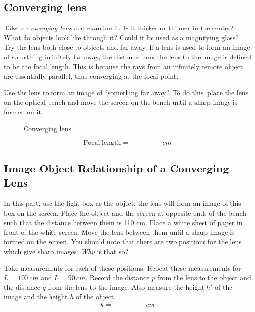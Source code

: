 \documentclass[11pt, a4paper]{article}
\begin{document}
\subsection{Converging lens}
Take a \textit{converging lens} and examine it.
Is it thicker or thinner in the center?
What do objects look like through it?
Could it be used as a magnifying glass?
Try the lens both close to objects and far away.
\fillwithlines{3cm}
If a lens is used to form an image of something infinitely far away, the
distance from the lens to the image is defined to be the focal length. 
This is because the rays from an infinitely remote object are essentially
parallel, thus converging at the focal point.

Use the lens to form an image of “something far away”. 
To do this, place the lens on the optical bench and move the screen on the
bench until a sharp image is formed on it. 
\begin{figure}[tbh]
    \centering
    \def\svgwidth{0.7\textwidth}
    
    \caption{Converging lens}
    \label{fig:convLens}
\end{figure}
\begin{equation*}
    \text{Focal length} = \underline{\hspace{2cm}}\si{cm}
\end{equation*}

\subsection{Image-Object Relationship of a Converging Lens}
In this part, use the light box as the object; the lens will form an image of
this box on the screen.
Place the object and the screen at opposite ends of the bench such that the
distance between them is 110 cm.
Place a white sheet of paper in front of the white screen. 
Move the lens between them until a sharp image is formed on the screen.
You should note that there are two positions for the lens which give sharp
images. \textit{Why} is that so?
\fillwithlines{3cm}

Take measurements for each of these positions.
Repeat these measurements for $L = 100~\si{cm}$ and $L = 90~\si{cm}$.
Record the distance $p$ from the lens to the object and the distance
$q$ from the lens to the image.
Also measure the height $h'$ of the image and the height $h$
of the object.
\begin{equation*}
    h = \underline{\hspace{2cm}}\si{cm}
\end{equation*}
\end{document}
